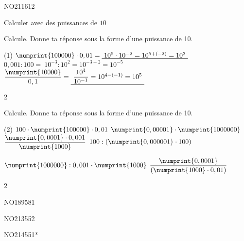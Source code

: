 \documentclass[a4paper,11pt]{report}
\begin{document}
\begin{exof}{NO211}{61}{2} %
\end{exof}

\begin{resolu}{Calculer avec des puissances de $10$}{
Calcule. Donne ta réponse sous la forme d'une puissance de 10.

     \begin{tasks}(1)
         \task $\numprint{100000}\cdot0,01=\underline{~10^5\cdot10^{-2}=10^{5+(-2)}=10^3~}$
         \task $0,001:100=\underline{~10^{-3}:10^2=10^{-3-2}=10^{-5}~}$
         \task $\dfrac{\numprint{10000}}{0,1}=\underline{~\dfrac{10^4}{10^{-1}}=10^{4-(-1)}=10^5~}$
     \end{tasks}

}{2}    
\end{resolu}

\begin{exo}{
    Calcule. Donne ta réponse sous la forme d'une puissance de 10.

     \begin{tasks}(2)
         \task $100\cdot\numprint{100000}\cdot0,01$
         \task $\numprint{0,00001}\cdot\numprint{1000000}$
         \task $\dfrac{\numprint{0,0001}\cdot0,001}{\numprint{1000}}$
         \task $100:(\numprint{0,000001}\cdot100)$
         
         \task $\numprint{1000000}:0,001\cdot\numprint{1000}$
         \task $\dfrac{\numprint{0,0001}}{(\numprint{1000}\cdot0,01)}$
     \end{tasks}
}{2}
\end{exo}


\begin{exof}{NO189}{58}{1} %
\end{exof}

\begin{exol}{NO213}{55}{2} %
\end{exol}

\begin{exol}{NO214}{55}{1*} %
\end{exol}



\end{document}

